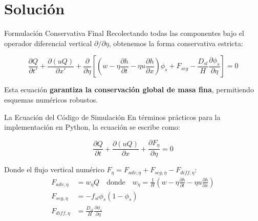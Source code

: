 \documentclass[10pt]{beamer}
\begin{document}
\section{Solución}

\begin{frame}{Formulación Conservativa Final}
    Recolectando todas las componentes bajo el operador diferencial vertical $\partial/\partial\eta$, obtenemos la forma conservativa estricta:
    
    \begin{equation}
        \frac{\partial Q}{\partial t'} + \frac{\partial (u Q)}{\partial x'} + \frac{\partial}{\partial \eta} \left[ \left( w - \eta \frac{\partial h}{\partial t} - \eta u \frac{\partial h}{\partial x} \right) \phi_s + F_{seg} - \frac{D_{sl}}{H} \frac{\partial \phi_s}{\partial \eta} \right] = 0
    \end{equation}
    
    Esta ecuación \textbf{garantiza la conservación global de masa fina}, permitiendo esquemas numéricos robustos.
\end{frame}

\begin{frame}{La Ecuación del Código de Simulación}
    En términos prácticos para la implementación en Python, la ecuación se escribe como:
    
    \begin{equation}
        \frac{\partial Q}{\partial t} + \frac{\partial (u Q)}{\partial x} + \frac{\partial F_\eta}{\partial \eta} = 0
    \end{equation}
    
    Donde el flujo vertical numérico $F_\eta = F_{adv,\eta} + F_{seg,\eta} - F_{diff,\eta}$:
    \begin{align*}
        F_{adv, \eta} &= w_\eta Q \quad \text{donde} \quad w_\eta = \frac{1}{H}\left( w - \eta \frac{\partial h}{\partial t} - \eta u \frac{\partial h}{\partial x} \right) \\
        F_{seg, \eta} &= -f_{sl} \phi_s (1 - \phi_s) \\
        F_{diff, \eta} &= \frac{D_{sl}}{H} \frac{\partial \phi_s}{\partial \eta}
    \end{align*}
\end{frame}
\end{document}
